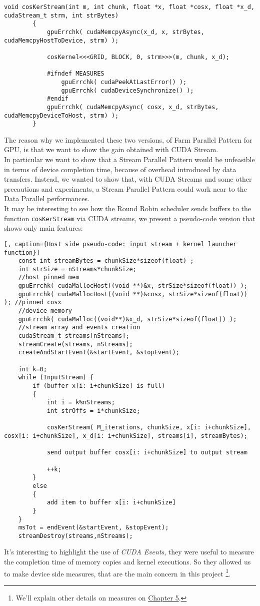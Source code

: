 \begin{itemize}
		\begin{lstlisting}[label=lst:str, caption={Data transfer host/device and kernel call, CUDA Streams version}]
		void cosKerStream(int m, int chunk, float *x, float *cosx, float *x_d, cudaStream_t strm, int strBytes)
		{     
			gpuErrchk( cudaMemcpyAsync(x_d, x, strBytes, cudaMemcpyHostToDevice, strm) ); 
			
			cosKernel<<<GRID, BLOCK, 0, strm>>>(m, chunk, x_d);
			
			#ifndef MEASURES
				gpuErrchk( cudaPeekAtLastError() );
				gpuErrchk( cudaDeviceSynchronize() );
			#endif   
			gpuErrchk( cudaMemcpyAsync( cosx, x_d, strBytes, cudaMemcpyDeviceToHost, strm) );
		}
		\end{lstlisting}
		
	\end{itemize}
	The reason why we implemented these two versions, of Farm Parallel Pattern for GPU, is that we want to show the gain obtained with CUDA Stream.\\
	In particular we want to show that a Stream Parallel Pattern would be unfeasible in terms of device completion time, because of overhead introduced by data transfers. Instead, we wanted to show that, with CUDA Streams and some other precautions and experiments, a Stream Parallel Pattern could work near to the Data Parallel performances.\\
	
	It may be interesting to see how the Round Robin scheduler sends buffers to the function \texttt{cosKerStream} via CUDA streams, we present a pseudo-code version that shows only main features:
	\begin{lstlisting}[, caption={Host side pseudo-code: input stream + kernel launcher function}]
	const int streamBytes = chunkSize*sizeof(float) ;
	int strSize = nStreams*chunkSize;	
	//host pinned mem
	gpuErrchk( cudaMallocHost((void **)&x, strSize*sizeof(float)) ); 
	gpuErrchk( cudaMallocHost((void **)&cosx, strSize*sizeof(float)) ); //pinned cosx
	//device memory	
	gpuErrchk( cudaMalloc((void**)&x_d, strSize*sizeof(float)) );
	//stream array and events creation 
	cudaStream_t streams[nStreams];
	streamCreate(streams, nStreams);
	createAndStartEvent(&startEvent, &stopEvent);
	
	int k=0;
	while (InputStream) {  
		if (buffer x[i: i+chunkSize] is full)
		{
			int i = k%nStreams;
			int strOffs = i*chunkSize;
			
			cosKerStream( M_iterations, chunkSize, x[i: i+chunkSize], cosx[i: i+chunkSize], x_d[i: i+chunkSize], streams[i], streamBytes);     
			   
			send output buffer cosx[i: i+chunkSize] to output stream
			
			++k;
		}
		else
		{
			add item to buffer x[i: i+chunkSize]
		}	
	} 
	msTot = endEvent(&startEvent, &stopEvent);
	streamDestroy(streams,nStreams); 	
	\end{lstlisting}
	It's interesting to highlight the use of \textit{CUDA Events}, they were useful to measure the completion time of memory copies and kernel executions. So they allowed us to make device side measures, that are the main concern in this project \footnote{We'll explain other details on measures on \hyperref[chap:experim]{Chapter 5}.}.
	
